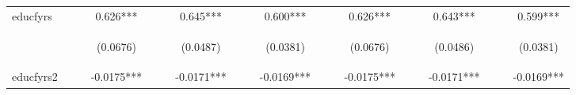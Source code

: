 \documentclass[]{article}
\begin{document}
\begin{center}
\begin{tabular}{lcccccccccccccccccc}
educfyrs &  &  & 0.626*** &  &  & 0.645*** &  &  & 0.600*** &  &  & 0.626*** &  &  & 0.643*** &  &  & 0.599*** \\
\vspace{4pt} & \begin{footnotesize}\end{footnotesize} & \begin{footnotesize}\end{footnotesize} & \begin{footnotesize}(0.0676)\end{footnotesize} & \begin{footnotesize}\end{footnotesize} & \begin{footnotesize}\end{footnotesize} & \begin{footnotesize}(0.0487)\end{footnotesize} & \begin{footnotesize}\end{footnotesize} & \begin{footnotesize}\end{footnotesize} & \begin{footnotesize}(0.0381)\end{footnotesize} & \begin{footnotesize}\end{footnotesize} & \begin{footnotesize}\end{footnotesize} & \begin{footnotesize}(0.0676)\end{footnotesize} & \begin{footnotesize}\end{footnotesize} & \begin{footnotesize}\end{footnotesize} & \begin{footnotesize}(0.0486)\end{footnotesize} & \begin{footnotesize}\end{footnotesize} & \begin{footnotesize}\end{footnotesize} & \begin{footnotesize}(0.0381)\end{footnotesize} \\
educfyrs2 &  &  & -0.0175*** &  &  & -0.0171*** &  &  & -0.0169*** &  &  & -0.0175*** &  &  & -0.0171*** &  &  & -0.0169*** \\

\end{tabular}
\end{center}
\end{document}
